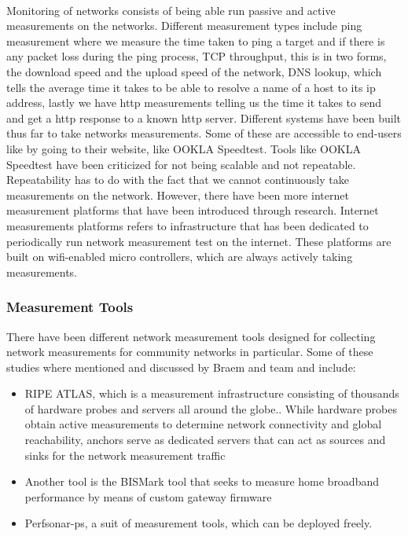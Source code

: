 \paragraph{}
Monitoring of networks consists of being able run passive and active measurements on the networks.
Different measurement types include ping measurement where we measure the time taken to ping a target and if there is any packet loss during the ping process, TCP throughput, this is in two forms, the download speed and the upload speed of the network, DNS lookup, which tells the average time it takes to be able to resolve a name of a host to its ip address, lastly we have http measurements telling us the time it takes to send and get a http response to a known http server.
Different systems have been built thus far to take networks measurements.
Some of these are accessible to end-users like by going to their website, like OOKLA Speedtest\cite{7523537}.
Tools like OOKLA Speedtest have been criticized for not being scalable and not repeatable\cite{7523537}.
Repeatability has to do with the fact that we cannot continuously take measurements on the network.
However, there have been more internet measurement platforms that have been introduced through research.
Internet measurements platforms refers to infrastructure that has been dedicated to periodically run network measurement test on the internet\cite{7076582}.
These platforms are built on wifi-enabled micro controllers, which are always actively taking measurements.
\subsubsection{Measurement Tools}\label{null:measurement-tools}
There have been different network measurement tools designed for collecting network measurements for community networks in particular.
Some of these studies where mentioned and discussed by Braem and team\cite{Braem:2015:AEQ:2830629.2830639} and include:
\begin{itemize}
    \item RIPE ATLAS, which is a measurement infrastructure consisting of thousands of hardware probes and servers all around the globe.\cite{7076582, Bajpai:2015:LLU:2805789.2805796}.
    While hardware probes obtain active measurements to determine network connectivity and global reachability, anchors serve as dedicated servers that can act as sources and sinks for the network measurement traffic\cite{Bajpai:2015:LLU:2805789.2805796}
    \item Another tool is the BISMark tool that seeks to measure home broadband performance by means of custom gateway firmware\cite{Braem:2015:AEQ:2830629.2830639}
    \item Perfsonar-ps, a suit of measurement tools, which can be deployed freely\cite{Braem:2015:AEQ:2830629.2830639}.
\end{itemize}
